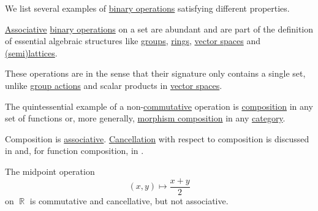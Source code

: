 \begin{example}\label{ex:def:binary_operation}
  We list several examples of \hyperref[def:binary_operation]{binary operations} satisfying different properties.

  \begin{thmenum}
     \hyperref[eq:def:binary_operation/associative]{Associative} \hyperref[def:binary_operation]{binary operations} on a set are abundant and are part of the definition of essential algebraic structures like \hyperref[def:group]{groups}, \hyperref[def:ring]{rings}, \hyperref[def:vector_space]{vector spaces} and \hyperref[def:lattice]{(semi)lattices}.

    These operations are  in the sense that their signature only contains a single set, unlike \hyperref[def:group_action]{group actions} and scalar products in \hyperref[def:vector_space]{vector spaces}.

     The quintessential example of a non-\hyperref[def:binary_operation/commutative]{commutative} operation is \hyperref[def:set_valued_map/composition]{composition} in any set of functions or, more generally, \hyperref[def:category/composition]{morphism composition} in any \hyperref[def:category]{category}.

    Composition is \hyperref[def:binary_operation/associative]{associative}. \hyperref[def:binary_operation/cancellative]{Cancellation} with respect to composition is discussed in  and, for function composition, in .

     The midpoint operation
    \begin{equation*}
      (x, y) \mapsto \dfrac {x + y} 2
    \end{equation*}
    on \( \BbbR \) is commutative and cancellative, but not associative.
  \end{thmenum}
\end{example}

